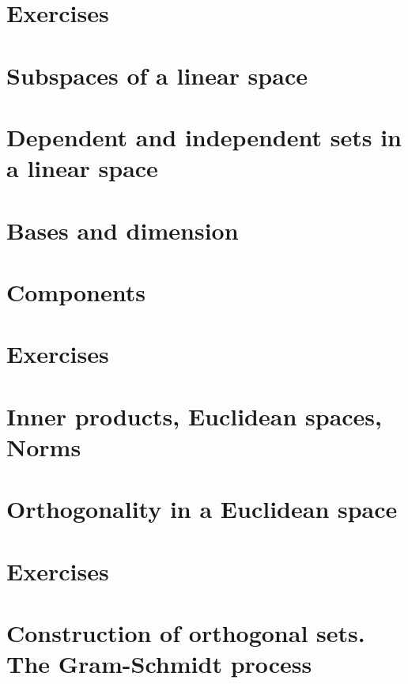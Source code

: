 \documentclass[cn,11pt,chinese]{elegantbook}
\numberwithin{equation}{section}
\begin{document}
\section{Exercises}



\section{Subspaces of a linear space}



\section{Dependent and independent sets in a linear space}


\section{Bases and dimension}



\section{Components}



\section{Exercises}



\section{Inner products, Euclidean spaces, Norms}



\section{Orthogonality in a Euclidean space}



\section{Exercises}


\section{Construction of orthogonal sets. The Gram-Schmidt process}
\end{document}
